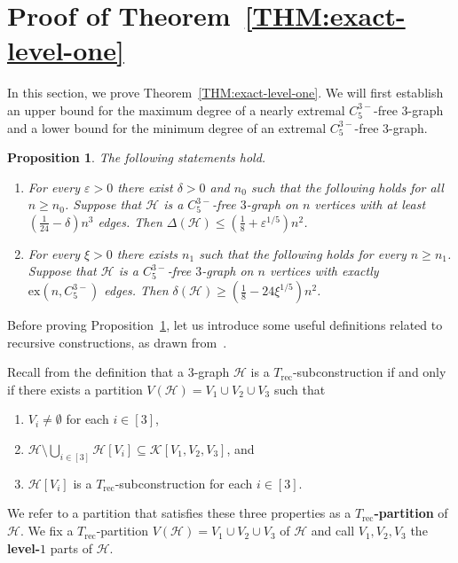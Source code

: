 \documentclass[11pt,a4paper]{article}
\newtheorem{proposition}[definition]{Proposition}
\theoremstyle{remark}
\begin{document}
\section{Proof of Theorem~\ref{THM:exact-level-one}}\label{SEC:proof-C5-exact}
%
In this section, we prove Theorem~\ref{THM:exact-level-one}. 
We will first establish an upper bound for the maximum degree of a nearly extremal $C_{5}^{3-}$-free $3$-graph and a lower bound for the minimum degree of an extremal $C_{5}^{3-}$-free $3$-graph. 
%
\begin{proposition}\label{PROP:C5minus-max-degree}  
    The following statements hold. 
    \begin{enumerate}[label=(\roman*)]
        \item\label{PROP:C5minus-max-degree-1} For every $\varepsilon > 0$ there exist $\delta>0$ and $n_0$ such that the following holds for all $n \ge n_0$. 
        Suppose that $\mathcal{H}$ is a $C_{5}^{3-}$-free $3$-graph on $n$ vertices with at least $\left(\frac{1}{24}-\delta\right)n^3$ edges. 
        Then $\Delta(\mathcal{H}) \le \left(\frac{1}{8} + \varepsilon^{1/5}\right) n^2$.
        \item\label{PROP:C5minus-max-degree-2} For every $\xi > 0$ there exists $n_1$ such that the following holds for every $n \ge n_1$. Suppose that $\mathcal{H}$ is a $C_{5}^{3-}$-free $3$-graph on $n$ vertices with exactly $\mathrm{ex}(n,C_{5}^{3-})$ edges. 
        Then $\delta(\mathcal{H}) \ge \left(\frac{1}{8} - 24\xi^{1/5}\right) n^2$.
    \end{enumerate}
\end{proposition}

Before proving Proposition~\ref{PROP:C5minus-max-degree}, let us introduce some useful definitions related to recursive constructions, as drawn from~\cite{PI14,LP22}. 

Recall from the definition that a $3$-graph $\mathcal{H}$ is a $T_{\mathrm{rec}}$-subconstruction if and only if there exists a partition $V(\mathcal{H}) = V_1 \cup V_2 \cup V_3$ such that 
\begin{enumerate}[label=(\roman*)]
    \item\label{it:T-rec-prop-1} $V_i \neq \emptyset$ for each $i \in [3]$, 
    \item\label{it:T-rec-prop-2}  $\mathcal{H} \setminus \bigcup_{i\in [3]}\mathcal{H}[V_i] \subseteq \mathcal{K}[V_1, V_2, V_3]$, and 
    \item\label{it:T-rec-prop-3} $\mathcal{H}[V_i]$ is a $T_{\mathrm{rec}}$-subconstruction for each $i \in [3]$. 
\end{enumerate}
%
We refer to a partition that satisfies these three properties as a \textbf{$T_{\mathrm{rec}}$-partition} of $\mathcal{H}$. 
We fix a $T_{\mathrm{rec}}$-partition $V(\mathcal{H}) = V_1 \cup V_2 \cup V_3$ of $\mathcal{H}$ 
and call $V_1, V_2, V_3$ the \textbf{level-$1$} parts of $\mathcal{H}$. 
\end{document}
